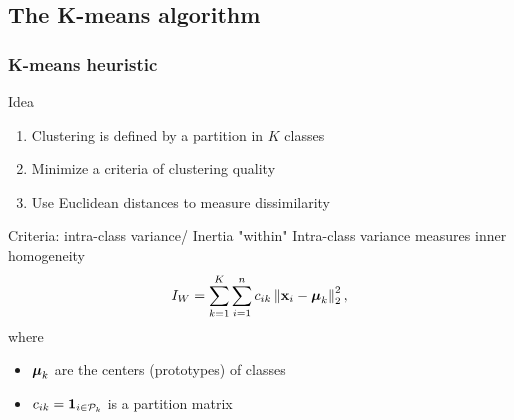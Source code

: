 \documentclass{beamer}\usepackage[]{graphicx}\usepackage[]{color}
\begin{document}
\subsection{The K-means algorithm}

\begin{frame}
  
  \frametitle{K-means heuristic}
  
  \begin{block}{Idea}
    \begin{enumerate}
      \item Clustering is defined by a partition in $K$ classes
      \item Minimize a criteria of clustering quality
      \item Use Euclidean distances to measure dissimilarity
    \end{enumerate}
  \end{block}

  \begin{block}{Criteria: intra-class variance/ Inertia "within"}
    Intra-class variance measures \alert{inner} homogeneity
    \begin{equation*}
      I_W = \sum_{k=1}^K \sum_{i=1}^n c_{ik} \left\| \mathbf{x}_i - \boldsymbol{\mu}_k \right\|_2^2,
    \end{equation*} 
    where 
    \begin{itemize}
      \item $\boldsymbol{\mu}_k$ are the centers (prototypes) of classes
      \item $c_{ik} = \mathbf{1}_{i\in\mathcal{P}_k}$ is a partition matrix
    \end{itemize}
  \end{block}

\end{frame}
\end{document}
